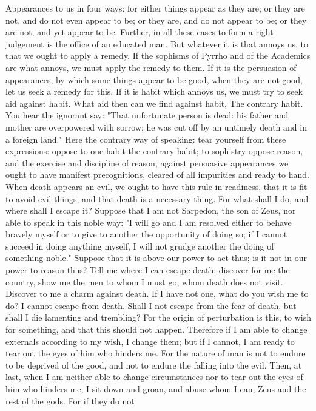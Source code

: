 \documentclass[a4paper]{article}
\begin{document}
    Appearances to us in four ways: for either things appear as they are; or
they are not, and do not even appear to be; or they are, and do not appear to
be; or they are not, and yet appear to be. Further, in all these cases to form
a right judgement is the office of an educated man. But whatever it is that
annoys us, to that we ought to apply a remedy. If the sophisms of Pyrrho and of
the Academics are what annoys, we must apply the remedy to them. If it is the
persuasion of appearances, by which some things appear to be good, when they
are not good, let us seek a remedy for this. If it is habit which annoys us, we
must try to seek aid against habit. What aid then can we find against habit,
The contrary habit. You hear the ignorant say: "That unfortunate person is
dead: his father and mother are overpowered with sorrow; he was cut off by an
untimely death and in a foreign land." Here the contrary way of speaking: tear
yourself from these expressions: oppose to one habit the contrary habit; to
sophistry oppose reason, and the exercise and discipline of reason; against
persuasive appearances we ought to have manifest precognitions, cleared of all
impurities and ready to hand.
    When death appears an evil, we ought to have this rule in readiness, that
it is fit to avoid evil things, and that death is a necessary thing. For what
shall I do, and where shall I escape it? Suppose that I am not Sarpedon, the
son of Zeus, nor able to speak in this noble way: "I will go and I am resolved
either to behave bravely myself or to give to another the opportunity of doing
so; if I cannot succeed in doing anything myself, I will not grudge another the
doing of something noble." Suppose that it is above our power to act thus; is
it not in our power to reason thus? Tell me where I can escape death: discover
for me the country, show me the men to whom I must go, whom death does not
visit. Discover to me a charm against death. If I have not one, what do you
wish me to do? I cannot escape from death. Shall I not escape from the fear of
death, but shall I die lamenting and trembling? For the origin of perturbation
is this, to wish for something, and that this should not happen. Therefore if I
am able to change externals according to my wish, I change them; but if I
cannot, I am ready to tear out the eyes of him who hinders me. For the nature
of man is not to endure to be deprived of the good, and not to endure the
falling into the evil. Then, at last, when I am neither able to change
circumstances nor to tear out the eyes of him who hinders me, I sit down and
groan, and abuse whom I can, Zeus and the rest of the gods. For if they do not
\end{document}
